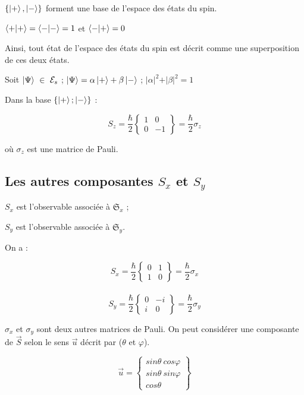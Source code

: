 \documentclass[12pt,a4paper,titlepage]{book}
\begin{document}
$\left\lbrace \ket+ , \ket- \right\rbrace$ forment une base de l'espace des états du spin.

\begin{center}
$\braket{+|+} = \braket{-|-} = 1$ et $\braket{-|+} = 0$
\end{center}
Ainsi, tout état de l'espace des états du spin est décrit comme une superposition de ces deux états.

Soit $\ket\Psi ~\in~ \mathcal{E}_s$ ; $\ket\Psi = \alpha \ket+ + \beta \ket-$ ; $\vert \alpha \vert^2 + \vert \beta \vert^2 = 1$

Dans la base $\left\lbrace \ket+ ; \ket- \right\rbrace$ :
\begin{center}
\[
S_z = \frac{\hbar}{2}
\left\lbrace
\begin{matrix}
1 & 0\\
0 & -1
\end{matrix}
\right\rbrace
= \frac{\hbar}{2} \sigma_z
\]
\end{center}
où $\sigma_z$ est une matrice de Pauli.

\subsection{Les autres composantes $S_x$ et $S_y$}

$S_x$ est l'observable associée à $\mathfrak{S}_x$ ;

$S_y$ est l'observable associée à $\mathfrak{S}_y$.

On a :
\begin{center}
\[
S_x = \frac{\hbar}{2}
\left\lbrace
\begin{matrix}
0 & 1\\
1 & 0
\end{matrix}
\right\rbrace
= \frac{\hbar}{2} \sigma_x
\]\\

\[
S_y = \frac{\hbar}{2}
\left\lbrace
\begin{matrix}
0 & -i\\
i & 0
\end{matrix}
\right\rbrace
= \frac{\hbar}{2} \sigma_y
\]
\end{center}

$\sigma_x$ et $\sigma_y$ sont deux autres matrices de Pauli. On peut considérer une composante de $\overrightarrow{S}$ selon le sens $\overrightarrow{u}$ décrit par ($\theta$ et $\varphi$).

\begin{center}
\[
\overrightarrow{u} =
\left\lbrace
\begin{matrix}
sin \theta ~cos \varphi \\
sin \theta ~sin \varphi \\
cos \theta
\end{matrix}
\right\rbrace
\]
\end{center}
\end{document}
